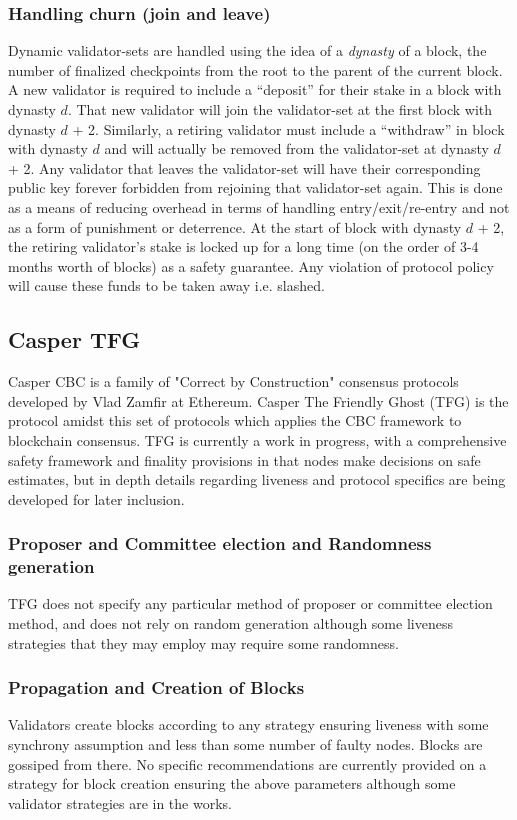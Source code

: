\documentclass[10pt,journal,compsoc]{IEEEtran}
\begin{document}
\subsubsection{Handling churn (join and leave)}
Dynamic validator-sets are handled using the idea of a \emph{dynasty} of a block, the number of finalized checkpoints from the root to the parent of the current block. A new validator is required to include a “deposit” for their stake in a block with dynasty $d$. That new validator will join the validator-set at the first block with dynasty $d$ + 2. Similarly, a retiring validator must include a “withdraw” in block with dynasty $d$ and will actually be removed from the validator-set at dynasty $d$ + 2. Any validator that leaves the validator-set will have their corresponding public key forever forbidden from rejoining that validator-set again. This is done as a means of reducing overhead in terms of handling entry/exit/re-entry and not as a form of punishment or deterrence. At the start of block with dynasty $d$ + 2, the retiring validator's stake is locked up for a long time (on the order of 3-4 months worth of blocks) as a safety guarantee. Any violation of protocol policy will cause these funds to be taken away i.e. slashed.

\subsection{Casper TFG}
Casper CBC is a family of "Correct by Construction" consensus protocols developed by Vlad Zamfir at Ethereum. Casper The Friendly Ghost (TFG) \cite{TFG} is the protocol amidst this set of protocols which applies the CBC framework to blockchain consensus. TFG is currently a work in progress, with a comprehensive safety framework and finality provisions in that nodes make decisions on safe estimates, but in depth details regarding liveness and protocol specifics are being developed for later inclusion. 

\subsubsection{Proposer and Committee election and Randomness generation}
TFG does not specify any particular method of proposer or committee election method, and does not rely on random generation although some liveness strategies that they may employ may require some randomness. 

\subsubsection{Propagation and Creation of Blocks}
Validators create blocks according to any strategy ensuring liveness with some synchrony assumption and less than some number of faulty nodes. Blocks are gossiped from there. No specific recommendations are currently provided on a strategy for block creation ensuring the above parameters although some validator strategies are in the works.
\end{document}
